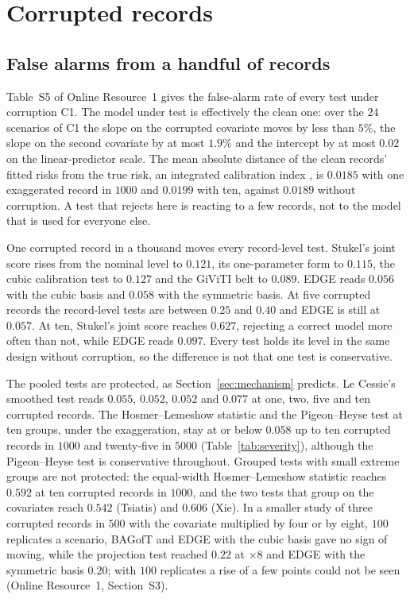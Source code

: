 \section{Corrupted records}\label{sec:contamination}

\subsection{False alarms from a handful of records}\label{sec:c1}

Table~S5 of Online Resource~1 gives the false-alarm rate of every test under corruption C1. The model
under test is effectively the clean one: over the $24$ scenarios of C1 the slope on the corrupted
covariate moves by less than $5\%$, the slope on the second covariate by at most $1.9\%$ and the
intercept by at most $0.02$ on the linear-predictor scale. The mean absolute distance of the clean
records' fitted risks from the true risk, an integrated calibration index \citep{austin2019ici}, is
$0.0185$ with one exaggerated record in $1000$ and $0.0199$ with ten, against $0.0189$ without
corruption. A test that rejects here is reacting to a few records, not to the model that is used for
everyone else.

One corrupted record in a thousand moves every record-level test. Stukel's joint score rises from the
nominal level to $0.121$, its one-parameter form to $0.115$, the cubic calibration test to $0.127$ and
the GiViTI belt to $0.089$. EDGE reads $0.056$ with the cubic basis and $0.058$ with the
symmetric basis. At five corrupted records the record-level tests are between $0.25$ and $0.40$ and
EDGE is still at $0.057$. At ten, Stukel's joint score reaches $0.627$, rejecting a correct
model more often than not, while EDGE reads $0.097$. Every test holds its level in the same design
without corruption, so the difference is not that one test is conservative.

The pooled tests are protected, as Section~\ref{sec:mechanism} predicts. Le Cessie's smoothed test
reads $0.055$, $0.052$, $0.052$ and $0.077$ at one, two, five and ten corrupted records. The
Hosmer--Lemeshow statistic and the Pigeon--Heyse test at ten groups, under the exaggeration, stay at
or below $0.058$ up to ten
corrupted records in $1000$ and twenty-five in $5000$ (Table~\ref{tab:severity}), although the
Pigeon--Heyse test is conservative throughout. Grouped tests with small extreme groups are not
protected: the equal-width Hosmer--Lemeshow statistic reaches $0.592$ at ten corrupted records in
$1000$, and the two tests that group on the covariates reach $0.542$ (Tsiatis) and $0.606$ (Xie). In a
smaller study of three corrupted records in $500$ with the covariate multiplied by four or by eight,
$100$ replicates a scenario, BAGofT and EDGE with the cubic basis gave no sign of moving, while the
projection test reached $0.22$ at $\times8$ and EDGE with the symmetric basis $0.20$; with $100$
replicates a rise of a few points could not be seen (Online Resource~1, Section~S3).

